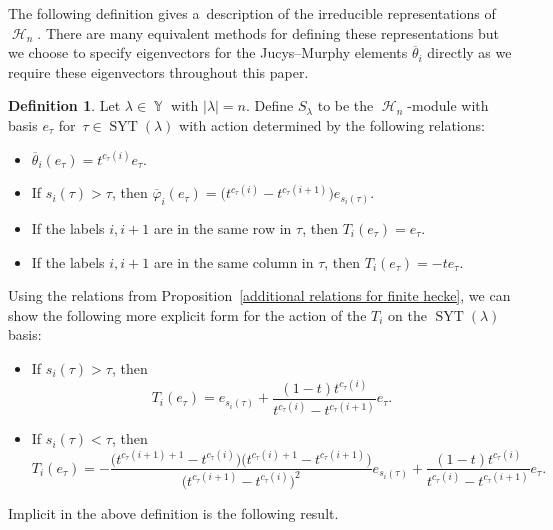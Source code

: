\documentclass[pdftex]{sigma}
\numberwithin{equation}{section}
\theoremstyle{definition}
\newtheorem{Definition}[Theorem]{Definition}
\DeclareMathOperator{\Par}{\mathbb{Y}}
\DeclareMathOperator{\SYT}{\mathrm{SYT}}
\DeclareMathOperator{\sH}{\mathscr{H}}
\begin{document}
The following definition gives a~description of the irreducible representations of $\sH_n$. There are many equivalent methods for defining these representations but we choose to specify eigenvectors for the Jucys--Murphy elements $\overline{\theta}_i$ directly as we require these eigenvectors throughout this paper.

\begin{Definition}\label{irreps for finite hecke Definition}
 Let $\lambda \in \Par$ with $|\lambda| = n$. Define $S_{\lambda}$ to be the $\sH_n$-module with basis $e_{\tau}$ for~${\tau \in \SYT(\lambda)}$ with action determined by the following relations:
 \begin{itemize}
\itemsep=0pt
 \item $\overline{\theta}_i(e_{\tau}) = t^{c_{\tau}(i)}e_{\tau}$.
 \item If $s_i(\tau) > \tau$, then $\overline{\varphi}_i(e_{\tau}) = \bigl(t^{c_{\tau}(i)}-t^{c_{\tau}(i+1)}\bigr)e_{s_i(\tau)}$.
 \item If the labels $i,i+1$ are in the same row in $\tau$, then $T_i(e_{\tau}) = e_{\tau}$.
 \item If the labels $i,i+1$ are in the same column in $\tau$, then $T_i(e_{\tau}) = -te_{\tau}$.
 \end{itemize}
\end{Definition}

Using the relations from Proposition~\ref{additional relations for finite hecke}, we can show the following more explicit form for the action of the $T_i$ on the $\SYT(\lambda)$ basis:
\begin{itemize}
\itemsep=0pt
 \item If $s_i(\tau)> \tau$, then
 \[
 T_i(e_{\tau}) = e_{s_i(\tau)} + \frac{(1-t)t^{c_{\tau}(i)}}{t^{c_{\tau}(i)} - t^{c_{\tau}(i+1)}} e_{\tau}.
 \]

 \item If $s_i(\tau) < \tau$, then
 \[
 T_i(e_{\tau}) = -\frac{\bigl(t^{c_{\tau}(i+1)+1}-t^{c_{\tau}(i)}\bigr)\bigl(t^{c_{\tau}(i)+1}-t^{c_{\tau}(i+1)}\bigr)}{\bigl(t^{c_{\tau}(i+1)}-t^{c_{\tau}(i)}\bigr)^2} e_{s_i(\tau)} + \frac{(1-t)t^{c_{\tau}(i)}}{t^{c_{\tau}(i)} - t^{c_{\tau}(i+1)}} e_{\tau}.
 \]

\end{itemize}

Implicit in the above definition is the following result.
\end{document}
